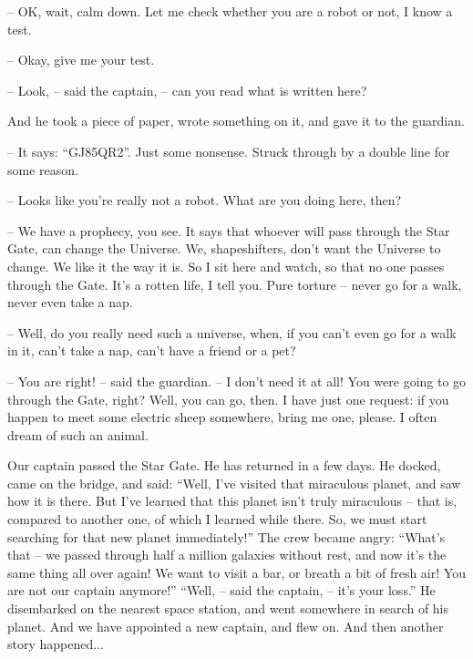 \documentclass[ebook,oneside,final,openright]{memoir}
\begin{document}
– OK, wait, calm down. Let me check whether you are a robot or not, I know a test.\par
– Okay, give me your test.\par
– Look, – said the captain, – can you read what is written here?\par
And he took a piece of paper, wrote something on it, and gave it to the guardian.\par
– It says: “GJ85QR2”. Just some nonsense. Struck through by a double line for some reason.\par
– Looks like you’re really not a robot. What are you doing here, then?\par
– We have a prophecy, you see. It says that whoever will pass through the Star Gate, can change the Universe. We, shapeshifters, don’t want the Universe to change. We like it the way it is. So I sit here and watch, so that no one passes through the Gate. It’s a rotten life, I tell you. Pure torture – never go for a walk, never even take a nap.\par
– Well, do you really need such a universe, when, if you can’t even go for a walk in it, can’t take a nap, can’t have a friend or a pet?\par
– You are right! – said the guardian. – I don’t need it at all! You were going to go through the Gate, right? Well, you can go, then. I have just one request: if you happen to meet some electric sheep somewhere, bring me one, please. I often dream of such an animal.\par
Our captain passed the Star Gate. He has returned in a few days. He docked, came on the bridge, and said: “Well, I’ve visited that miraculous planet, and saw how it is there. But I’ve learned that this planet isn’t truly miraculous – that is, compared to another one, of which I learned while there. So, we must start searching for that new planet immediately!” The crew became angry: “What’s that – we passed through half a million galaxies without rest, and now it’s the same thing all over again! We want to visit a bar, or breath a bit of fresh air! You are not our captain anymore!” “Well, – said the captain, – it’s your loss.” He disembarked on the nearest space station, and went somewhere in search of his planet. And we have appointed a new captain, and flew on. And then another story happened...
\end{document}
